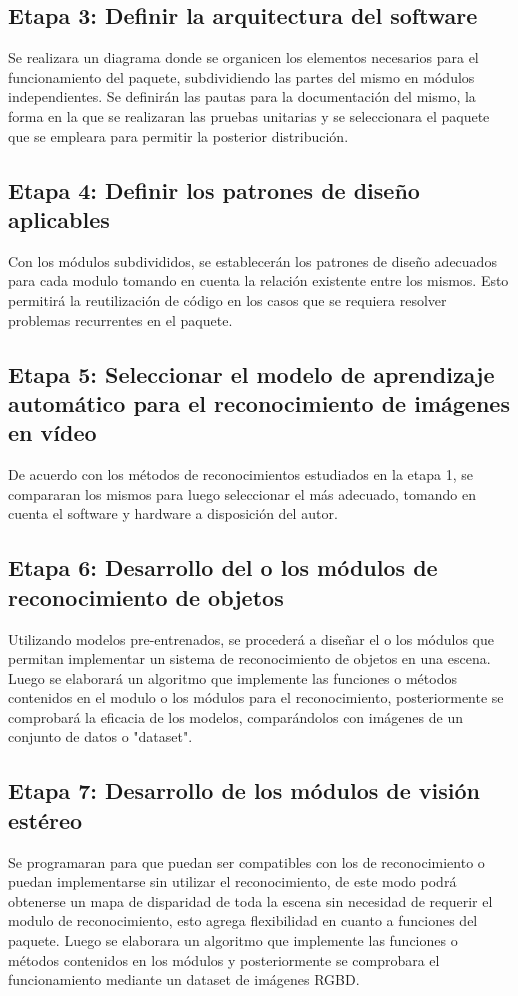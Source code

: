 \documentclass[letterpaper,titlepage,12pt,oneside,spanish,final]{report_eie}
\numberwithin{equation}{chapter}%
\numberwithin{figure}{chapter}%
\numberwithin{table}{chapter}%
\numberwithin{definition}{chapter}%
\numberwithin{lemma}{chapter}%
\numberwithin{theorem}{chapter}%
\numberwithin{corollary}{chapter}%
\numberwithin{condition}{chapter}%
\numberwithin{criterion}{chapter}%
\numberwithin{problem}{chapter}%
\numberwithin{property}{chapter}%
\numberwithin{proposition}{chapter}%
\numberwithin{solution}{chapter}%
\numberwithin{conjecture}{chapter}%
\begin{document}
\subsection*{Etapa 3: Definir la arquitectura del software}
Se realizara un diagrama donde se organicen los elementos necesarios para el funcionamiento del paquete, subdividiendo las partes del mismo en módulos independientes. Se definirán las pautas para la documentación del mismo, la forma en la que se realizaran las pruebas unitarias y se seleccionara el paquete que se empleara para permitir la posterior distribución.
\subsection*{Etapa 4: Definir los patrones de diseño aplicables}
Con los módulos subdivididos, se establecerán los patrones de diseño adecuados para cada modulo tomando en cuenta la relación existente entre los mismos. Esto permitirá la reutilización de código en los casos que se requiera resolver problemas recurrentes en el paquete.
\subsection*{Etapa 5: Seleccionar el modelo de aprendizaje automático para el reconocimiento de imágenes en vídeo}
De acuerdo con los métodos de reconocimientos estudiados en la etapa 1, se compararan los mismos para luego seleccionar el más adecuado, tomando en cuenta el software y hardware a disposición del autor.
\subsection*{Etapa 6: Desarrollo del o los módulos de reconocimiento de objetos}
Utilizando modelos pre-entrenados, se procederá a diseñar el o los módulos que permitan implementar un sistema de reconocimiento de objetos en una escena. Luego se elaborará un algoritmo que implemente las funciones o métodos contenidos en el modulo o los módulos para el reconocimiento, posteriormente se comprobará la eficacia de los modelos, comparándolos con imágenes de un conjunto de datos o "dataset".
\subsection*{Etapa 7: Desarrollo de los módulos de visión estéreo}
Se programaran para que puedan ser compatibles con los de reconocimiento o puedan implementarse sin utilizar el reconocimiento, de este modo podrá obtenerse un mapa de disparidad de toda la escena sin necesidad de requerir el modulo de reconocimiento, esto agrega flexibilidad en cuanto a funciones del paquete. Luego se elaborara un algoritmo que implemente las funciones o métodos contenidos en los módulos y posteriormente se comprobara el funcionamiento mediante un dataset de imágenes RGBD.
\end{document}
